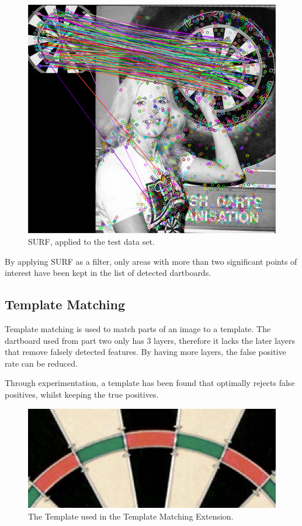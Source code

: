 \documentclass[conference]{IEEEtran}
\begin{document}
\begin{figure}[!htb]
\begin{center}
\includegraphics[width=0.8\linewidth]{images/SURF.png}
\caption{SURF, applied to the test data set. }
\label{default}
\end{center}
\end{figure}
\par
By applying SURF as a filter, only areas with more than two significant points of interest have been kept in the list of detected dartboards.



\subsection{Template Matching}
Template matching is used to  match parts of an image to a template. The dartboard used from part two only has 3 layers, therefore it lacks the later layers that remove falsely detected features. By having more layers, the false positive rate can be reduced. \par

Through experimentation, a template has been found that optimally rejects false positives, whilst keeping the true positives.  
\par 
\begin{figure}[!htb]
\begin{center}
\includegraphics[width=1\linewidth]{images/template.png}
\caption{The Template used in the Template Matching Extension. }
\label{default}
\end{center}
\end{figure}
\end{document}
